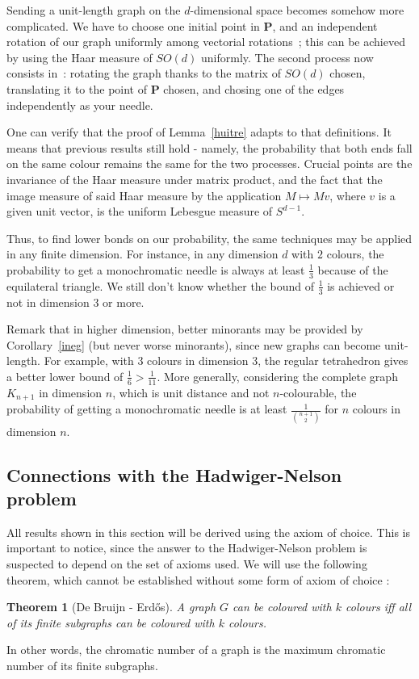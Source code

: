 \documentclass[a4paper,11pt]{article}
\newtheorem{theo}{Theorem}
\theoremstyle{definition}
\theoremstyle{remark}
\begin{document}
Sending a unit-length graph on the $d$-dimensional space becomes somehow more 
complicated. We have to choose one initial point in $ \mathbf{P} $, and an independent 
rotation of our graph uniformly among vectorial rotations~; this can be achieved 
by using the Haar measure of $SO(d)$ uniformly. The second process now consists 
in~: rotating the graph thanks to the matrix of $SO(d)$ chosen, translating it 
to the point of $\mathbf{P}$ chosen, and chosing one of the 
edges independently as your needle.

One can verify that the proof of Lemma~\ref{huitre} adapts to that definitions. 
It means that previous results still hold - namely, the probability that both 
ends fall on the same colour remains the same for the two processes. Crucial 
points are the invariance of the Haar measure under matrix product, and the 
fact that the image measure of said Haar measure by the application 
$M\mapsto Mv$, where $v$ is a given unit vector, is the uniform Lebesgue 
measure of $S^{d-1}$.

Thus, to find lower bonds on our probability, the same techniques may be applied 
in any finite dimension. For instance, in any dimension $d$ with $2$ colours,
the probability to get a monochromatic  
needle is always at least $\frac{1}{3}$ because of the equilateral triangle. 
We still don't know whether the bound of $\frac{1}{3}$ is achieved or not in 
dimension $3$ or more. 

Remark that in higher dimension, better minorants may be provided by 
Corollary~\ref{ineg} (but never worse minorants), since new graphs can 
become unit-length. For example, with $3$ colours in dimension $3$, the regular 
tetrahedron gives a better lower bound 
of $\frac 1 6 >\frac 1 {11}$. More generally, considering the complete graph 
$K_{n+1}$ in dimension $n$, which is unit distance and not $n$-colourable, the 
probability of getting a monochromatic needle is at least $\frac{1}{\binom{n+1}{2}}$ 
for $n$ colours in dimension $n$.

\subsection{Connections with the Hadwiger-Nelson problem} \label{hn}
All results shown in this section will be derived using the axiom of choice. 
This is important to notice, since the answer to the Hadwiger-Nelson problem is 
suspected to depend on the set of axioms used. We will use the 
following theorem, which cannot be established without some form of axiom of 
choice :
\begin{theo}[De Bruijn - Erdős]
 A graph $G$ can be coloured with $k$ colours iff all of its finite subgraphs 
 can be coloured with $k$ colours.
\end{theo}
In other words, the chromatic number of a graph is the maximum chromatic number 
of its finite subgraphs.
\end{document}
